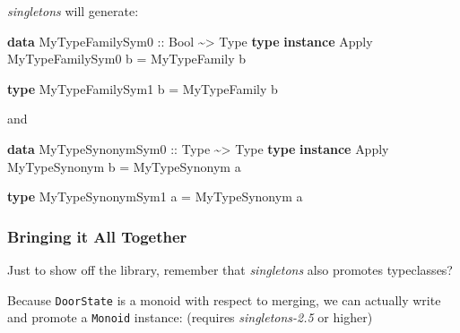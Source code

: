 \documentclass[]{article}
\newenvironment{Shaded}{}{}
\newcommand{\DataTypeTok}[1]{\textcolor[rgb]{0.56,0.13,0.00}{#1}}
\newcommand{\KeywordTok}[1]{\textcolor[rgb]{0.00,0.44,0.13}{\textbf{#1}}}
\newcommand{\NormalTok}[1]{#1}
\newcommand{\OperatorTok}[1]{\textcolor[rgb]{0.40,0.40,0.40}{#1}}
\newcommand{\OtherTok}[1]{\textcolor[rgb]{0.00,0.44,0.13}{#1}}
\begin{document}
\begin{Shaded}
\end{Shaded}

\emph{singletons} will generate:

\begin{Shaded}
\begin{Highlighting}[]
\KeywordTok{data} \DataTypeTok{MyTypeFamilySym0}\OtherTok{ ::} \DataTypeTok{Bool} \OperatorTok{\textasciitilde{}>} \DataTypeTok{Type}
\KeywordTok{type} \KeywordTok{instance} \DataTypeTok{Apply} \DataTypeTok{MyTypeFamilySym0}\NormalTok{ b }\OtherTok{=} \DataTypeTok{MyTypeFamily}\NormalTok{ b}

\KeywordTok{type} \DataTypeTok{MyTypeFamilySym1}\NormalTok{ b }\OtherTok{=} \DataTypeTok{MyTypeFamily}\NormalTok{ b}
\end{Highlighting}
\end{Shaded}

and

\begin{Shaded}
\begin{Highlighting}[]
\KeywordTok{data} \DataTypeTok{MyTypeSynonymSym0}\OtherTok{ ::} \DataTypeTok{Type} \OperatorTok{\textasciitilde{}>} \DataTypeTok{Type}
\KeywordTok{type} \KeywordTok{instance} \DataTypeTok{Apply} \DataTypeTok{MyTypeSynonym}\NormalTok{ b }\OtherTok{=} \DataTypeTok{MyTypeSynonym}\NormalTok{ a}

\KeywordTok{type} \DataTypeTok{MyTypeSynonymSym1}\NormalTok{ a }\OtherTok{=} \DataTypeTok{MyTypeSynonym}\NormalTok{ a}
\end{Highlighting}
\end{Shaded}

\hypertarget{bringing-it-all-together}{%
\subsubsection{Bringing it All Together}\label{bringing-it-all-together}}

Just to show off the library, remember that \emph{singletons} also promotes
typeclasses?

Because \texttt{DoorState} is a monoid with respect to merging, we can actually
write and promote a \texttt{Monoid} instance: (requires \emph{singletons-2.5} or
higher)

\begin{Shaded}
\end{Shaded}
\end{document}
